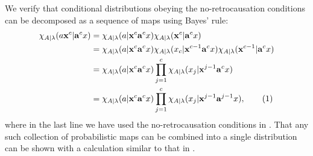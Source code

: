 \documentclass[10pt, a4paper]{article}
\numberwithin{equation}{section} %
\theoremstyle{definition}
\theoremstyle{plain}
\newcommand{\usenumber}{%
  \refstepcounter{equation}\tag{\theequation}
}
\newcommand{\?}{\mathrel{?}} %
\newcommand{\cvec}[1]{\boldsymbol{\mathbf{#1}}}    %
\begin{document}
              We verify that conditional distributions obeying the no-retrocausation conditions can be decomposed as a sequence of maps using Bayes' rule:
              \begin{align*}
                \chi_{A|\lambda}(a\cvec{x}^c|\cvec{a}^cx) &= \chi_{A|\lambda}(a|\cvec{x}^c\cvec{a}^cx) \chi_{A|\lambda}(\cvec{x}^{c}|\cvec{a}^cx) \\
                                                          &= \chi_{A|\lambda}(a|\cvec{x}^c\cvec{a}^cx) \chi_{A|\lambda}(x_c|\cvec{x}^{c-1}\cvec{a}^cx) \chi_{A|\lambda}(\cvec{x}^{c-1}|\cvec{a}^cx) \\
                                                          &= \chi_{A|\lambda}(a|\cvec{x}^c\cvec{a}^cx) \prod_{j=1}^c \chi_{A|\lambda}(x_j|\cvec{x}^{j-1}\cvec{a}^cx) \\
                                                          &= \chi_{A|\lambda}(a|\cvec{x}^c\cvec{a}^{c}x) \prod_{j=1}^c \chi_{A|\lambda}(x_j|\cvec{x}^{j-1}\cvec{a}^{j-1}x), \usenumber
              \end{align*}
              where in the last line we have used the no-retrocausation conditions in . That any such collection of probabilistic maps can be combined into a single distribution can be shown with a calculation similar to that in .
\end{document}
